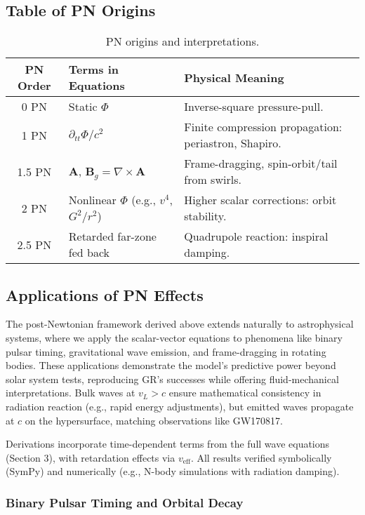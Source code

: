 \subsection{Table of PN Origins}

\begin{table}[h!]
\centering
\begin{tabular}{|c|l|l|}
\hline
PN Order & Terms in Equations & Physical Meaning \\
\hline
0 PN & Static $\Phi$ & Inverse-square pressure-pull. \\
1 PN & $\partial_{tt} \Phi / c^2$ & Finite compression propagation: periastron, Shapiro. \\
1.5 PN & $\mathbf{A}$, $\mathbf{B}_g = \nabla \times \mathbf{A}$ & Frame-dragging, spin-orbit/tail from swirls. \\
2 PN & Nonlinear $\Phi$ (e.g., $v^4$, $G^2 / r^2$) & Higher scalar corrections: orbit stability. \\
2.5 PN & Retarded far-zone fed back & Quadrupole reaction: inspiral damping. \\
\hline
\end{tabular}
\caption{PN origins and interpretations.}
\end{table}

\subsection{Applications of PN Effects}

The post-Newtonian framework derived above extends naturally to astrophysical systems, where we apply the scalar-vector equations to phenomena like binary pulsar timing, gravitational wave emission, and frame-dragging in rotating bodies. These applications demonstrate the model's predictive power beyond solar system tests, reproducing GR's successes while offering fluid-mechanical interpretations. Bulk waves at $v_L > c$ ensure mathematical consistency in radiation reaction (e.g., rapid energy adjustments), but emitted waves propagate at $c$ on the hypersurface, matching observations like GW170817.

Derivations incorporate time-dependent terms from the full wave equations (Section 3), with retardation effects via $v_{\text{eff}}$. All results verified symbolically (SymPy) and numerically (e.g., N-body simulations with radiation damping).

\subsubsection{Binary Pulsar Timing and Orbital Decay}

